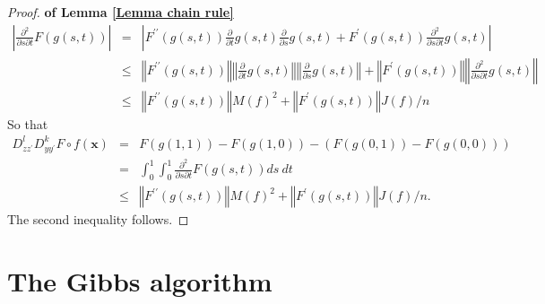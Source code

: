 \documentclass[final,12pt]{colt2018} %
\begin{document}
\begin{proof}{\bf of Lemma \protect\ref{Lemma chain rule}}
							\begin{eqnarray*}
								\left\vert \frac{\partial ^{2}}{\partial s\partial t}F\left( g\left(
								s,t\right) \right) \right\vert &=&\left\vert F^{\prime \prime }\left(
								g\left( s,t\right) \right) \frac{\partial }{\partial t}g\left( s,t\right) 
								\frac{\partial }{\partial s}g\left( s,t\right) +F^{\prime }\left( g\left(
								s,t\right) \right) \frac{\partial ^{2}}{\partial s\partial t}g\left(
								s,t\right) \right\vert \\
								&\leq &\left\Vert F^{\prime \prime }\left( g\left( s,t\right) \right)
								\right\Vert \left\Vert \frac{\partial }{\partial t}g\left( s,t\right)
								\right\Vert \left\Vert \frac{\partial }{\partial s}g\left( s,t\right)
								\right\Vert +\left\Vert F^{\prime }\left( g\left( s,t\right) \right)
								\right\Vert \left\Vert \frac{\partial ^{2}}{\partial s\partial t}g\left(
								s,t\right) \right\Vert \\
								&\leq &\left\Vert F^{\prime \prime }\left( g\left( s,t\right) \right)
								\right\Vert M\left( f\right) ^{2}+\left\Vert F^{\prime }\left( g\left(
								s,t\right) \right) \right\Vert J\left( f\right) /n
							\end{eqnarray*}%
							So that%
							\begin{eqnarray*}
								D_{zz^{\prime }}^{l}D_{yy^{\prime }}^{k}F\circ f\left( \mathbf{x}\right)
								&=&F\left( g\left( 1,1\right) \right) -F\left( g\left( 1,0\right) \right)
								-\left( F\left( g\left( 0,1\right) \right) -F\left( g\left( 0,0\right)
								\right) \right) \\
								&=&\int_{0}^{1}\int_{0}^{1}\frac{\partial ^{2}}{\partial s\partial t}F\left(
								g\left( s,t\right) \right) ds~dt \\
								&\leq &\left\Vert F^{\prime \prime }\left( g\left( s,t\right) \right)
								\right\Vert M\left( f\right) ^{2}+\left\Vert F^{\prime }\left( g\left(
								s,t\right) \right) \right\Vert J\left( f\right) /n.
							\end{eqnarray*}%
							The second inequality follows.
						\end{proof}
						
						
						
						\section{The Gibbs algorithm\label{Subsection Gibbs Algorithm
								computations}}
						
\end{document}
